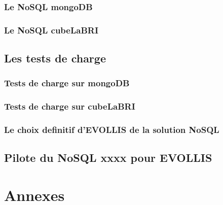 \documentclass[12pt]{report}
\begin{document}
\section{Le \textsf{NoSQL mongoDB}}

\section{Le \textsf{NoSQL} \textsf{cubeLaBRI}}


\chapter{Les tests de charge}
\section{Tests de charge sur \textsf{mongoDB}}
\section{Tests de charge sur \textsf{cubeLaBRI}}
\section{Le choix definitif d'\textsf{EVOLLIS} de la solution \textsf{NoSQL}}

\chapter{Pilote du \textsf{NoSQL} xxxx pour \sf  EVOLLIS}

%

\nocite{wikiNoSQL}

%


\part{Annexes}
\appendix

\end{document}
